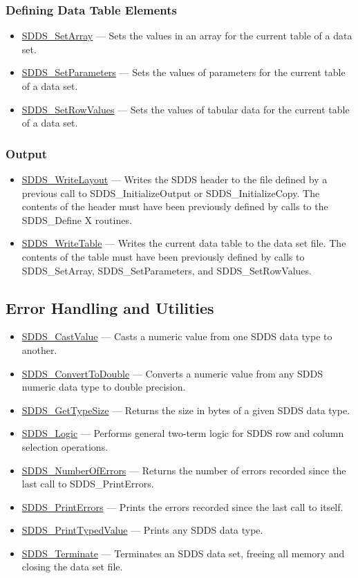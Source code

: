 \documentclass[11pt]{article}
\newcommand{\progref}[1]{\hyperref{SDDS_#1}{{\tt SDDS\_#1} (}{)}{SDDS_#1}}
\begin{document}
\subsubsection{Defining Data Table Elements}

\begin{itemize}
\item \progref{SetArray} --- Sets the values in an array for the current table of a data set.
\item \progref{SetParameters} --- Sets the values of parameters for the current table of a data set.
\item \progref{SetRowValues} --- Sets the values of tabular data for the current table of a data set. 
\end{itemize}

\subsubsection{Output}

\begin{itemize}
\item \progref{WriteLayout} --- Writes the SDDS header to the file defined by a previous call to SDDS\_InitializeOutput or SDDS\_InitializeCopy. The contents of the header must have been previously defined by calls to the SDDS\_Define X routines.
\item \progref{WriteTable} --- Writes the current data table to the data set file. The contents of the table must have been previously defined by calls to SDDS\_SetArray, SDDS\_SetParameters, and SDDS\_SetRowValues. 
\end{itemize}

\subsection{Error Handling and Utilities}

\begin{itemize}
\item \progref{CastValue} --- Casts a numeric value from one SDDS data type to another.
\item \progref{ConvertToDouble} --- Converts a numeric value from any SDDS numeric data type to double precision.
\item \progref{GetTypeSize} --- Returns the size in bytes of a given SDDS data type.
\item \progref{Logic} --- Performs general two-term logic for SDDS row and column selection operations.
\item \progref{NumberOfErrors} --- Returns the number of errors recorded since the last call to SDDS\_PrintErrors.
\item \progref{PrintErrors} --- Prints the errors recorded since the last call to itself.
\item \progref{PrintTypedValue} --- Prints any SDDS data type.
\item \progref{Terminate} --- Terminates an SDDS data set, freeing all memory and closing the data set file. 
\end{itemize}
\end{document}

